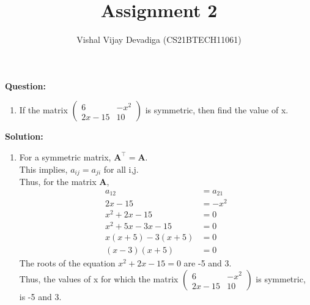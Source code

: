 \documentclass[journal,12pt,twocolumn]{IEEEtran}
\title{Assignment 2}
\author{Vishal Vijay Devadiga (CS21BTECH11061)}
\date{}
\let\vec\mathbf
\newcommand{\myvec}[1]{\ensuremath{\begin{pmatrix}#1\end{pmatrix}}}
\newcommand{\question}{\noindent \textbf{Question: }}
\newcommand{\solution}{\noindent \textbf{Solution: }}
\begin{document}
\maketitle
\question
\begin{enumerate}[label=]
	\item If the matrix $\myvec{6 & -x^2 \\ 2x - 15 & 10}$ is symmetric, then find the value of x.
\end{enumerate}
\solution
\begin{enumerate}[label=]
	\item For a symmetric matrix, $\vec{A}^{\top} = \vec{A}$. \\
	This implies, $a_{ij} = a_{ji}$ for all i,j. \\
	Thus, for the matrix $\vec{A}$,
	\begin{align}
		a_{12} &= a_{21}
		\\
		2x - 15 &= -x^2
		\\
		x^2 + 2x - 15 &= 0
		\\
		x^2 + 5x - 3x -15 &= 0
		\\
		x(x+5) - 3(x+5) &=0
		\\
		(x-3)(x+5) &= 0
	\end{align}
	The roots of the equation $x^2 + 2x -15 = 0$ are -5 and 3. \\
	Thus, the values of x for which the matrix $\myvec{6 & -x^2 \\ 2x - 15 & 10}$ is symmetric, is -5 and 3.
	
\end{enumerate}
\end{document}
